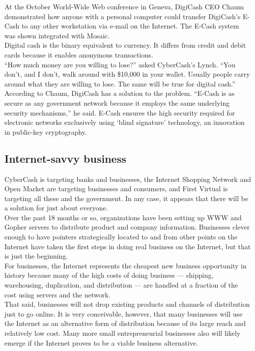 At the October World-Wide Web conference in Geneva, DigiCash CEO Chaum
demonstrated how anyone with a personal computer could transfer
DigiCash's E-Cash to any other workstation via e-mail on the Internet.
The E-Cash system was shown integrated with Mosaic.\\

Digital cash is the binary equivalent to currency. It differs from
credit and debit cards because it enables anonymous transactions.\\

``How much money are you willing to lose?'' asked CyberCash's Lynch.
``You don't, and I don't, walk around with \$10,000 in your wallet.
Usually people carry around what they are willing to lose. The same
will be true for digital cash.''\\

According to Chaum, DigiCash has a solution to the problem. ``E-Cash is
as secure as any government network because it employs the same
underlying security mechanisms,'' he said. E-Cash ensures the high
security required for electronic networks exclusively using `blind
signature' technology, an innovation in public-key cryptography.


\subsection{Internet-savvy business}
CyberCash is targeting banks and businesses, the Internet Shopping
Network and Open Market are targeting businesses and consumers, and
First Virtual is targeting all these and the government. In any case,
it appears that there will be a solution for just about everyone.\\

Over the past 18 months or so, organizations have been setting up WWW
and Gopher servers to distribute product and company information.
Businesses clever enough to have pointers strategically located to and
from other points on the Internet have taken the first steps in doing
real business on the Internet, but that is just the beginning.\\

For businesses, the Internet represents the cheapest new business
opportunity in history because many of the high costs of doing business ---
shipping, warehousing, duplication, and distribution --- are
handled at a fraction of the cost using servers and the network.\\

That said, businesses will not drop existing products and channels of
distribution just to go online. It is very conceivable, however, that
many businesses will use the Internet as an alternative form of
distribution because of its large reach and relatively low cost. Many
more small entrepreneurial businesses also will likely emerge if the
Internet proves to be a viable business alternative.


